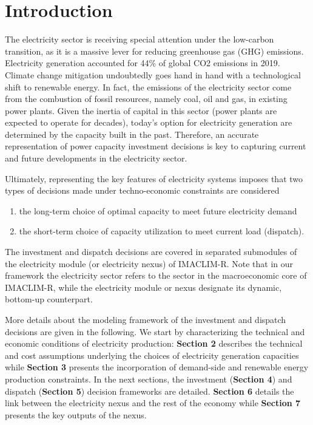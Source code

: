 \section{Introduction}
The electricity sector is receiving special attention under the low-carbon transition, as it is a massive lever for reducing greenhouse gas (GHG) emissions. Electricity generation accounted for 44\% of global CO2 emissions in 2019. Climate change mitigation undoubtedly goes hand in hand with a technological shift to renewable energy. In fact, the emissions of the electricity sector come from the combustion of fossil resources, namely coal, oil and gas, in existing power plants. Given the inertia of capital in this sector (power plants are expected to operate for decades), today's option for electricity generation are determined by the capacity built in the past. Therefore, an accurate representation of power capacity investment decisions is key to capturing current and future developments in the electricity sector.


Ultimately, representing the key features of electricity systems imposes that two types of decisions made under techno-economic constraints are considered
\begin{enumerate}
    \item the long-term choice of optimal capacity to meet future electricity demand
    \item the short-term choice of capacity utilization to meet current load (dispatch).
\end{enumerate}
The investment and dispatch decisions are covered in separated submodules of the electricity module (or electricity nexus) of IMACLIM-R. Note that in our framework the electricity sector refers to the sector in the macroeconomic core of IMACLIM-R, while the electricity module or nexus designate its dynamic, bottom-up counterpart.

More details about the modeling framework of the investment and dispatch decisions are given in the following. We start by characterizing the technical and economic conditions of electricity production:  \textbf{Section 2} describes the technical and cost assumptions underlying the choices of electricity generation capacities while \textbf{Section 3} presents the incorporation of demand-side and renewable energy production constraints. In the next sections, the investment (\textbf{Section 4}) and dispatch (\textbf{Section 5}) decision frameworks are detailed. \textbf{Section 6}  details the link between the electricity nexus and the rest of the economy while \textbf{Section 7} presents the key outputs of the nexus.

